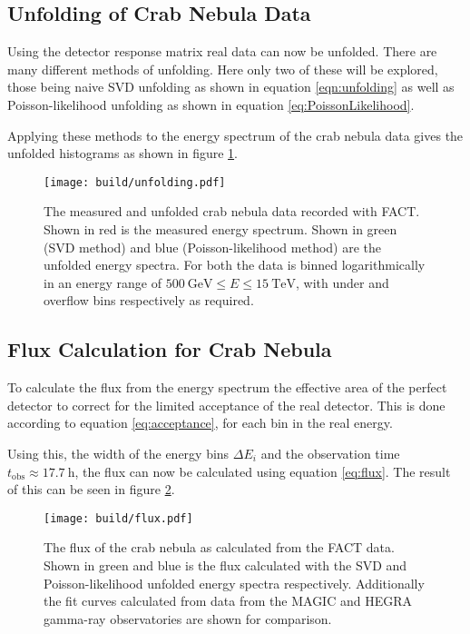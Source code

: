        \subsection{Unfolding of Crab Nebula Data}
            Using the detector response matrix real data can now be unfolded.
            There are many different methods of unfolding.
            Here only two of these will be explored, those being naive SVD unfolding as shown in equation \eqref{eqn:unfolding} as well as Poisson-likelihood unfolding as shown in equation \eqref{eq:PoissonLikelihood}.

            Applying these methods to the energy spectrum of the crab nebula data gives the unfolded histograms as shown in figure \ref{fig:unfolding}.
            \begin{figure}
                \centering
                \texttt{[image: build/unfolding.pdf]}
                \caption{
                    The measured and unfolded crab nebula data recorded with FACT.
                    Shown in red is the measured energy spectrum.
                    Shown in green (SVD method) and blue (Poisson-likelihood method) are the unfolded energy spectra.
                    For both the data is binned logarithmically in an energy range of $\SI{500}{\giga\electronvolt} \leq E \leq \SI{15}{\tera\electronvolt}$, with under and overflow bins respectively as required.
                }
                \label{fig:unfolding}
            \end{figure}

        \subsection{Flux Calculation for Crab Nebula}
            To calculate the flux from the energy spectrum the effective area of the perfect detector to correct for the limited acceptance of the real detector.
            This is done according to equation \eqref{eq:acceptance}, for each bin in the real energy.

            Using this, the width of the energy bins $\Delta E_i$ and the observation time $t_\text{obs} \approx \SI{17.7}{\hour}$, the flux can now be calculated using equation \eqref{eq:flux}.
            The result of this can be seen in figure \ref{fig:flux}.
            \begin{figure}
                \centering
                \texttt{[image: build/flux.pdf]}
                \caption{
                    The flux of the crab nebula as calculated from the FACT data.
                    Shown in green and blue is the flux calculated with the SVD and Poisson-likelihood unfolded energy spectra respectively.
                    Additionally the fit curves calculated from data from the MAGIC\cite{MAGIC} and HEGRA\cite{HEGRA} gamma-ray observatories are shown for comparison.
                }
                \label{fig:flux}
            \end{figure}


